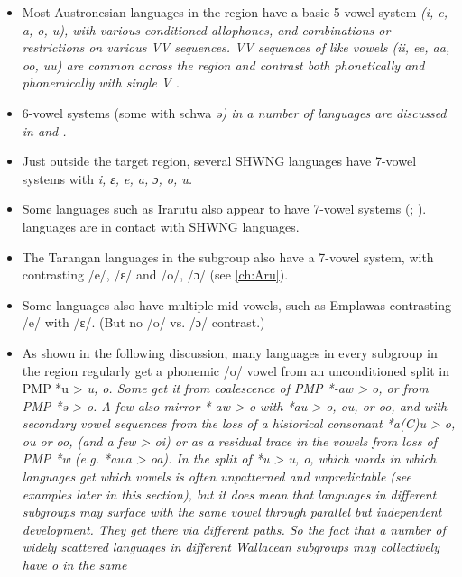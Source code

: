 \begin{itemize}
	\item	Most Austronesian languages in the region have a basic
				5-vowel system \it{(i, e, a, o, u}),
				with various conditioned allophones,
				and combinations or restrictions on various VV sequences.
				VV sequences of like vowels (\it{ii,
				ee, aa, oo, uu}) are common across the region
				and contrast both phonetically
				and phonemically with single V \citep{Grimes1991c,CulhaneEdwards2021,Tamelan2021}.
	\item	6-vowel systems (some with schwa \it{ə}) in a number of
				 languages are discussed in  and .
	\item	Just outside the target region,
				several SHWNG languages have 7-vowel systems with \it{i,
				ɛ, e, a, ɔ, o, u}.
	\item	Some  languages such as Irarutu also
				appear to have 7-vowel systems (\citealp[651]{Voorhoeve1995a}; \citealp[43]{Jackson2014}).
				 languages are in contact with SHWNG languages.
	\item	The Tarangan languages in the  subgroup also have
				a 7-vowel system, with contrasting /e/,
				/ɛ/ and /o/, /ɔ/ (see \ref{ch:Aru}).
	\item Some languages  also have multiple
				mid vowels, such as Emplawas contrasting /e/ with /ɛ/.
				(But no /o/ vs. /ɔ/ contrast.)
	\item	As shown in the following discussion,
				many languages in every subgroup in the region regularly get
				a phonemic /o/ vowel from an unconditioned split in PMP *u > \it{u, o}.
				Some get it from coalescence of PMP *-aw > \it{o},
				or from PMP *ə > \it{o}.
				A few also mirror *-aw > \it{o} with *au > \it{o,
				ou,} or \it{oo}, and with secondary vowel sequences from the
				loss of a historical consonant *a(C)u > \it{o,
				ou} or \it{oo}, (and a few > \it{oi}) or as a residual trace
				in the vowels from loss of PMP *w (e.g. *awa > \it{oa}).
				In the split of *u > \it{u,
				o}, which words in which languages get which vowels is often
				unpatterned and unpredictable (see examples later in this section),
				but it does mean that languages in different subgroups may surface
				with the same vowel through parallel but independent development.
				They get there via different paths.
				So the fact that a number of widely scattered languages in different
				Wallacean subgroups may collectively have \it{o} in the same

\end{itemize}
